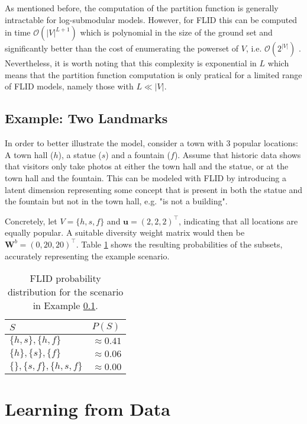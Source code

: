 As mentioned before, the computation of the partition function is generally intractable for log-submodular models. However, for FLID this can be computed in time $\mathcal{O}(|V|^{L+1})$ which is polynomial in the size of the ground set and significantly better than the cost of enumerating the powerset of $V$, i.e. $\mathcal{O}(2^{|V|})$ \citep{tschiatschek16learning}. Nevertheless, it is worth noting that this complexity is exponential in $L$ which means that the partition function computation is only pratical for a limited range of FLID models, namely those with $L \ll |V|$.

\subsection{Example: Two Landmarks}
\label{sec:flid-toy}

In order to better illustrate the model, consider a town with 3 popular locations: A town hall ($h$), a statue ($s$) and a fountain ($f$). Assume that historic data shows that visitors only take photos at either the town hall and the statue, or at the town hall and the fountain. This can be modeled with FLID by introducing a latent dimension representing some concept that is present in both the statue and the fountain but not in the town hall, e.g. "is not a building".

Concretely, let $V = \{h, s, f\}$ and $\mathbf{u} = \left(2, 2, 2\right)^{\intercal}$, indicating that all locations are equally popular. A suitable diversity weight matrix would then be $\mathbf{W}^{b} = \left(0, 20, 20\right)^{\intercal}$. Table \ref{tab:flid-toy-probs} shows the resulting probabilities of the subsets, accurately representing the example scenario.

\begin{table}
  \centering
  \caption{FLID probability distribution for the scenario in Example \ref{sec:flid-toy}.}
  \begin{tabular}{@{}ll@{}}
    \toprule
    $S$ & $P(S)$  \\
    \midrule
    $\{h,s\}, \{h,f\}$ & $\approx 0.41$ \\
    $\{h\}, \{s\}, \{f\}$ & $\approx 0.06$ \\
    $\{\}, \{s,f\}, \{h,s,f\}$ & $\approx 0.00$ \\
    \bottomrule
  \end{tabular}
  \label{tab:flid-toy-probs}
\end{table}

\section{Learning from Data}
\label{sec:learning}

